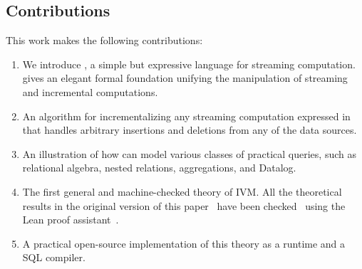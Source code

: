 \subsection{Contributions}

This work makes the following contributions:
\begin{enumerate}[nosep, leftmargin=0pt, itemindent=0.5cm, label=\textbf{(\arabic{*})}]
  \item We introduce \dbsp, a simple but expressive language for
    streaming computation. \dbsp gives an elegant formal foundation
    unifying the manipulation of streaming and incremental
    computations.
  \item An algorithm for incrementalizing any streaming computation
    expressed in \dbsp that handles arbitrary insertions and deletions
    from any of the data sources.
  \item An illustration of how \dbsp can model various classes of
    practical queries, such as relational algebra, nested relations,
    aggregations, and Datalog.
  \item The first general and machine-checked theory of IVM.  All the
    theoretical results in the original version of this
    paper~\cite{budiu-vldb23} have been checked~\cite{dbsp-theory}
    using the Lean proof assistant~\cite{moura-cade15}.
  \item A practical open-source implementation of this theory as a
    runtime and a SQL compiler.
\end{enumerate}

